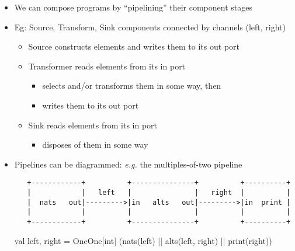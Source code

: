 \documentclass{concdistfoils}
\begin{document}
\begin{slide}
\begin{itemize}
\item We can compose programs by ``pipelining'' their component stages
\vfill
\item Eg: Source, Transform, Sink components connected by channels (left, right)

\begin{itemize}
\item Source constructs elements and writes them to its out port 
\vfill
\item Transformer reads elements from its in port 
\begin{itemize}
\item selects and/or transforms them in  some way, then
\item writes them to its out port
\end{itemize}
\vfill
\item Sink reads elements from its in port
\begin{itemize}
\item disposes of them in some way
\end{itemize}
\end{itemize}
\end{itemize}
\end{slide}

\begin{slide}
\begin{itemize}
\item Pipelines can be diagrammed: \textit{e.g.} the multiples-of-two pipeline
\vfill
\begin{smaller}
\begin{verbatim}
   +------------+          +---------------+          +----------+
   |            |   left   |               |   right  |          |
   |  nats   out|--------->|in   alts   out|--------->|in  print |
   |            |          |               |          |          |
   +------------+          +---------------+          +----------+
\end{verbatim}
\end{smaller}
\vfill
\begin{scala}
                val left, right = OneOne[int]
                (nats(left) || alts(left, right) || print(right))
\end{scala}
\end{itemize}
\end{slide}
\end{document}
